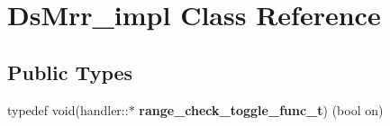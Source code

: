 \hypertarget{classDsMrr__impl}{}\section{Ds\+Mrr\+\_\+impl Class Reference}
\label{classDsMrr__impl}
\subsection*{Public Types}
\begin{DoxyCompactItemize}
\item 
\mbox{\label{classDsMrr__impl_a13ef09ad1cf2ce9e5ec540fa97afafa8}} 
typedef void(handler\+::$\ast$ {\bfseries range\+\_\+check\+\_\+toggle\+\_\+func\+\_\+t}) (bool on)
\end{DoxyCompactItemize}

